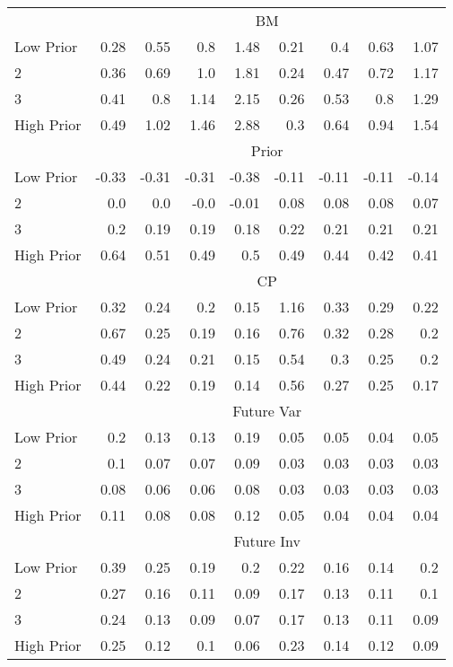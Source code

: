 \begin{table}[!ht]
\begin{tabular}{lrrrrrrrr}
  
    & \multicolumn{8}{c}{BM}  \\
     \cmidrule(r){2-5} \cmidrule(r){6-9}
    Low Prior  & 0.28  & 0.55  & 0.8  & 1.48  & 0.21  & 0.4  & 0.63  & 1.07   \\
    2  & 0.36  & 0.69  & 1.0  & 1.81  & 0.24  & 0.47  & 0.72  & 1.17   \\
    3  & 0.41  & 0.8  & 1.14  & 2.15  & 0.26  & 0.53  & 0.8  & 1.29   \\
    High Prior  & 0.49  & 1.02  & 1.46  & 2.88  & 0.3  & 0.64  & 0.94  & 1.54   \\
    
  
    & \multicolumn{8}{c}{Prior}  \\
     \cmidrule(r){2-5} \cmidrule(r){6-9}
    Low Prior  & -0.33  & -0.31  & -0.31  & -0.38  & -0.11  & -0.11  & -0.11  & -0.14   \\
    2  & 0.0  & 0.0  & -0.0  & -0.01  & 0.08  & 0.08  & 0.08  & 0.07   \\
    3  & 0.2  & 0.19  & 0.19  & 0.18  & 0.22  & 0.21  & 0.21  & 0.21   \\
    High Prior  & 0.64  & 0.51  & 0.49  & 0.5  & 0.49  & 0.44  & 0.42  & 0.41   \\
    
  
    & \multicolumn{8}{c}{CP}  \\
     \cmidrule(r){2-5} \cmidrule(r){6-9}
    Low Prior  & 0.32  & 0.24  & 0.2  & 0.15  & 1.16  & 0.33  & 0.29  & 0.22   \\
    2  & 0.67  & 0.25  & 0.19  & 0.16  & 0.76  & 0.32  & 0.28  & 0.2   \\
    3  & 0.49  & 0.24  & 0.21  & 0.15  & 0.54  & 0.3  & 0.25  & 0.2   \\
    High Prior  & 0.44  & 0.22  & 0.19  & 0.14  & 0.56  & 0.27  & 0.25  & 0.17   \\

    & \multicolumn{8}{c}{Future Var}  \\
     \cmidrule(r){2-5} \cmidrule(r){6-9}
    Low Prior  & 0.2  & 0.13  & 0.13  & 0.19  & 0.05  & 0.05  & 0.04  & 0.05   \\
    2  & 0.1  & 0.07  & 0.07  & 0.09  & 0.03  & 0.03  & 0.03  & 0.03   \\
    3  & 0.08  & 0.06  & 0.06  & 0.08  & 0.03  & 0.03  & 0.03  & 0.03   \\
    High Prior  & 0.11  & 0.08  & 0.08  & 0.12  & 0.05  & 0.04  & 0.04  & 0.04   \\
  
    & \multicolumn{8}{c}{Future Inv}  \\
     \cmidrule(r){2-5} \cmidrule(r){6-9}
    Low Prior  & 0.39  & 0.25  & 0.19  & 0.2  & 0.22  & 0.16  & 0.14  & 0.2   \\
    2  & 0.27  & 0.16  & 0.11  & 0.09  & 0.17  & 0.13  & 0.11  & 0.1   \\
    3  & 0.24  & 0.13  & 0.09  & 0.07  & 0.17  & 0.13  & 0.11  & 0.09   \\
    High Prior  & 0.25  & 0.12  & 0.1  & 0.06  & 0.23  & 0.14  & 0.12  & 0.09   \\
    

\end{tabular}
\end{table}
